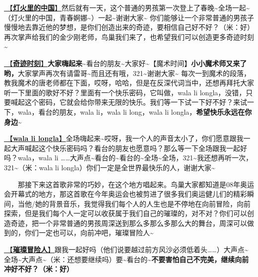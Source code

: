 \documentclass[]{ctexbook}
\begin{document}
\hyperref[China-in-the-light]{🎵【\textbf{灯火里的中国}】}然后就有一天，这个普通的男孩第一次登上了春晚\textasciitilde 全场一起\textasciitilde（灯火里的中国，青春婀娜\textasciitilde）一起\textasciitilde 谢谢大家\textasciitilde{}
你们能够让一个非常普通的男孩子慢慢地去靠近他的梦想，是你们创造出来的奇迹，要相信自己好不好？（米：好）再次掌声给我们的金少刚老师，鸟巢我们来了，也希望我们可以创造更多奇迹时刻\textasciitilde{}

\hyperref[magic-moment]{🎵【\textbf{奇迹时刻}】}\textbf{大家嗨起来\textasciitilde{}}看台的朋友\textasciitilde 大家好\textasciitilde【魔术时间】\textbf{小小魔术师又来了哟，}大家掌声再次有请雷哥\textasciitilde 而且还有哦，321\textasciitilde 谢谢大家\textasciitilde{}
每次一到魔术的段落，教我魔术的唐老师都在下面，哎呀，哈哈，但是在反深代词当中，还想再拜托大家听一下里面的歌好不好？里面有一个快乐密码，它叫做，wala li longla，没错，只要喊起这个密码，它就会给你带来无限的快乐。我们等一下试一下好不好？来试一下，wala，看台的朋友，wala li，wala li long，wala li longla，\textbf{希望快乐永远在你身边\textasciitilde{}}

\hyperref[wala-li-longla]{🎵【\textbf{wala li longla}】}全场嗨起来\textasciitilde 哎呀，我一个人的声音太小了，你们愿意跟我一起大声喊起这个快乐密码吗？看台的朋友也愿意吗？那么等一下全场跟我一起好吗？wala，wala li \ldots\ldots 大声点\textasciitilde 看台的\textasciitilde 看台的\textasciitilde 全场\textasciitilde 全场，321\textasciitilde 我还想再听一次，321\textasciitilde（米：wala li longla）你们一定是全世界最快乐的人，谢谢大家\textasciitilde{}

  那接下来这首歌非常的巧妙，在这个地方唱起来。鸟巢大家都知道是08年奥运会开幕式的地方，那这首歌在今年奥运会也被剪进了很多我们奥运健儿们的精彩瞬间，当他/她的背景音乐，我觉得我们每个人的人生也是不停地在向前冒险，向前探索，但是我们每个人一定可以收获属于我们自己的璀璨的，对不对？你们可以创造奇迹，把一个非常普通的男孩周深送到那么多那么多那么大的舞台，周深可以做到的，你们一定也可以，向前冲吧，璀璨冒险人\textasciitilde{}

\hyperref[adventurers]{🎵【\textbf{璀璨冒险人}】}跟我一起好吗（他们说要越过前方风沙必须低着头\ldots\ldots）大声点\textasciitilde 全场\textasciitilde 大声点\textasciitilde（米：还想要继续吗）要\textasciitilde 看台的\textasciitilde{}\textbf{不要害怕自己不完美，继续向前冲好不好？（米：好）}
\end{document}
